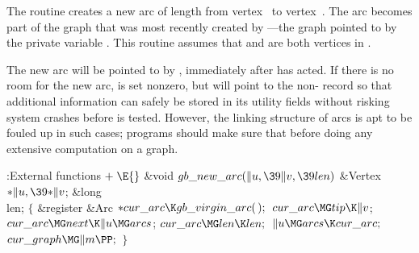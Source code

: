 The routine  creates a new arc of
length 
from vertex~ to vertex~. The arc becomes part of the graph that
was most recently created by ---the graph
pointed to by the private variable . This routine assumes
that  and  are both vertices in .

The new arc will be pointed to by , immediately after
 has acted. If there is no room for the
new arc,
 is set nonzero, but  will point
to the non-\PB{$\NULL$}
record 
so that additional information can safely be stored in its utility fields
without risking system crashes before  is tested.
However, the linking structure of arcs is apt to be fouled up in such
cases; programs should make sure that 
before doing any
extensive computation on a graph.

\Y\B\4:External functions\X${}\mathrel+\E{}$\6
\1\1\&{void} ${}\\{gb\_new\_arc}(\|u,\39\|v,\39\\{len}){}$\6
\&{Vertex} ${}{*}\|u,\39{*}\|v{}$;\6
\&{long} \\{len};\2\2\6
${}\{{}$\5
\1\&{register} \&{Arc} ${}{*}\\{cur\_arc}\K\\{gb\_virgin\_arc}(\,);{}$\7
${}\\{cur\_arc}\MG\\{tip}\K\|v{}$;\5
${}\\{cur\_arc}\MG\\{next}\K\|u\MG\\{arcs}{}$;\5
${}\\{cur\_arc}\MG\\{len}\K\\{len};{}$\6
${}\|u\MG\\{arcs}\K\\{cur\_arc};{}$\6
${}\\{cur\_graph}\MG\|m\PP;{}$\6
\4${}\}{}$\2\par
\fi

